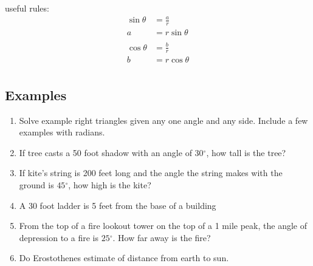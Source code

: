 \documentclass{exam}
\newcommand{\dg}{\ensuremath{^\circ}}
\begin{document}
  useful rules:
  \begin{align*}
    \sin \theta & = \frac{a}{r} \\
    a           & = r \sin \theta \\
    \\
    \cos \theta & = \frac{b}{r} \\
    b           & = r \cos \theta \\
  \end{align*}

  \subsection{Examples}

  \begin{enumerate}
    \item Solve example right triangles given any one angle and any side.  Include a few examples with radians.

    \item If tree casts a 50 foot shadow with an angle of $30 \dg$, how tall is the tree?

    \item If kite's string is 200 feet long and the angle the string makes with the ground is $45 \dg$, how high is the
      kite?

    \item A 30 foot ladder is 5 feet from the base of a building

    \item From the top of a fire lookout tower on the top of a 1 mile peak, the angle of depression to a fire is
      $25 \dg$.  How far away is the fire?

    \item Do Erostothenes estimate of distance from earth to sun.
  \end{enumerate}
\end{document}
